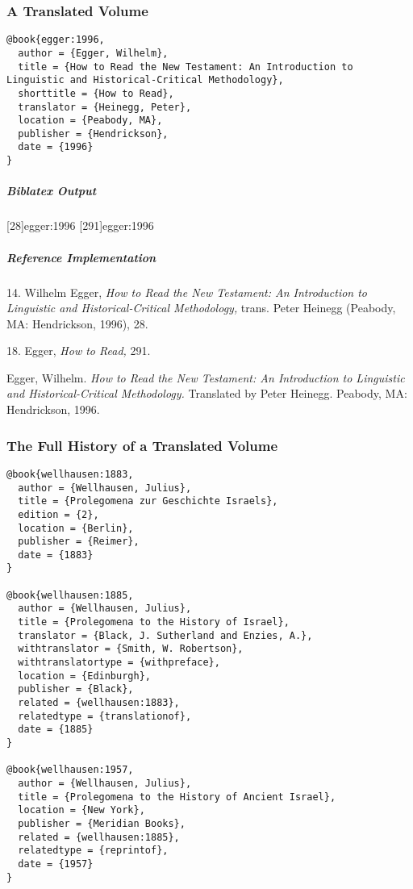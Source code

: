\documentclass[a4paper]{article}
\newenvironment{biboutput}{%
  \subparagraph{Biblatex Output}
}{\color{black}}
\newenvironment{refimp}{%
  \subparagraph{Reference Implementation}
  \color{reference-colour}
  \rm
}{\par\color{black}}
\begin{document}
\subsubsection{A Translated Volume}

\begin{lstlisting}
@book{egger:1996,
  author = {Egger, Wilhelm},
  title = {How to Read the New Testament: An Introduction to Linguistic and Historical-Critical Methodology},
  shorttitle = {How to Read},
  translator = {Heinegg, Peter},
  location = {Peabody, MA},
  publisher = {Hendrickson},
  date = {1996}
}
\end{lstlisting}  

\begin{biboutput}
  [28]{egger:1996}
  [291]{egger:1996}
\end{biboutput}

\begin{refimp}
  \hspace*{\bibindent}14. Wilhelm Egger, \emph{How to Read the New Testament:
  An Introduction to Linguistic and Historical-Critical Methodology,} trans.\@
  Peter Heinegg (Peabody, MA: Hendrickson, 1996), 28.

  \hspace*{\bibindent}18. Egger, \emph{How to Read,} 291.
  
  \hangindent\bibindent Egger, Wilhelm. \emph{How to Read the New Testament:
  An Introduction to Linguistic and Historical-Critical Methodology.}
  Translated by Peter Heinegg. Peabody, MA: Hendrickson, 1996.
\end{refimp}

\subsubsection{The Full History of a Translated Volume}

\begin{lstlisting}
@book{wellhausen:1883,
  author = {Wellhausen, Julius},
  title = {Prolegomena zur Geschichte Israels},
  edition = {2},
  location = {Berlin},
  publisher = {Reimer},
  date = {1883}
}

@book{wellhausen:1885,
  author = {Wellhausen, Julius},
  title = {Prolegomena to the History of Israel},
  translator = {Black, J. Sutherland and Enzies, A.},
  withtranslator = {Smith, W. Robertson},
  withtranslatortype = {withpreface},
  location = {Edinburgh},
  publisher = {Black},
  related = {wellhausen:1883},
  relatedtype = {translationof},
  date = {1885}
}

@book{wellhausen:1957,
  author = {Wellhausen, Julius},
  title = {Prolegomena to the History of Ancient Israel},
  location = {New York},
  publisher = {Meridian Books},
  related = {wellhausen:1885},
  relatedtype = {reprintof},
  date = {1957}
}
\end{lstlisting}
\end{document}
